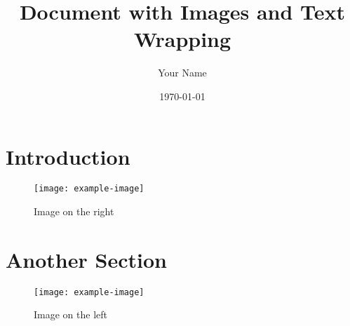 \documentclass[11pt,a4paper]{article}
\title{Document with Images and Text Wrapping}
\author{Your Name}
\date{\today}
\begin{document}
\maketitle

\section{Introduction}
\lipsum[1] %

\begin{wrapfigure}{r}{0.5\textwidth}
  \centering
  \texttt{[image: example-image]}
  \caption{Image on the right}
\end{wrapfigure}
\lipsum[2-3] %

\clearpage

\section{Another Section}
\lipsum[4] %

\begin{wrapfigure}{l}{0.5\textwidth}
  \centering
  \texttt{[image: example-image]}
  \caption{Image on the left}
\end{wrapfigure}
\lipsum[5-6] %
\end{document}
